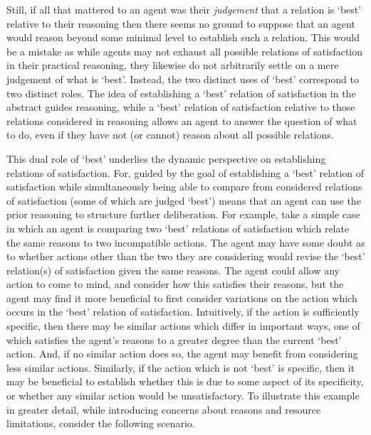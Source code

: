 \documentclass[10pt]{article}
\begin{document}
Still, if all that mattered to an agent was their \emph{judgement} that a relation is `best' relative to their reasoning then there seems no ground to suppose that an agent would reason beyond some minimal level to establish such a relation.
This would be a mistake as while agents may not exhaust all possible relations of satisfaction in their practical reasoning, they likewise do not arbitrarily settle on a mere judgement of what is `best'.
Instead, the two distinct uses of `best' correspond to two distinct roles.
The idea of establishing a `best' relation of satisfaction in the abstract guides reasoning, while a `best' relation of satisfaction relative to those relations considered in reasoning allows an agent to answer the question of what to do, even if they have not (or cannot) reason about all possible relations.


This dual role of `best' underlies the dynamic perspective on establishing relations of satisfaction.
For, guided by the goal of establishing a `best' relation of satisfaction while simultaneously being able to compare from considered relations of satisfaction (some of which are judged `best') means that an agent can use the prior reasoning to structure further deliberation.
For example, take a simple case in which an agent is comparing two `best' relations of satisfaction which relate the same reasons to two incompatible actions.
The agent may have some doubt as to whether actions other than the two they are considering would revise the `best' relation(s) of satisfaction given the same reasons.
The agent could allow any action to come to mind, and consider how this satisfies their reasons, but the agent may find it more beneficial to first consider variations on the action which occurs in the `best' relation of satisfaction.
Intuitively, if the action is sufficiently specific, then there may be similar actions which differ in important ways, one of which satisfies the agent's reasons to a greater degree than the current `best' action.
And, if no similar action does so, the agent may benefit from considering less similar actions.
Similarly, if the action which is not `best' is specific, then it may be beneficial to establish whether this is due to some aspect of its specificity, or whether any similar action would be unsatisfactory.
To illustrate this example in greater detail, while introducing concerns about reasons and resource limitations, consider the following scenario.
\end{document}
